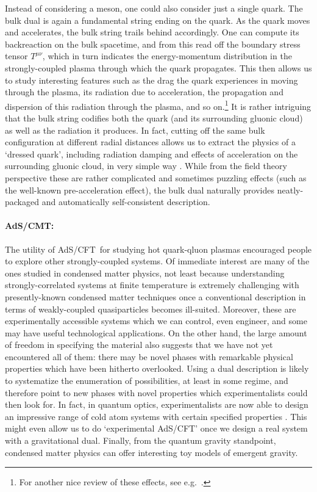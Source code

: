 \documentclass[12pt,a4paper]{article}
\def\AC{AdS/CFT}
\begin{document}
Instead of considering a meson, one could also consider just a single quark.  The bulk dual is again a fundamental string ending on the quark.  As the quark moves and accelerates, the bulk string trails behind accordingly.  One can compute its backreaction on the bulk spacetime, and from this read off the boundary stress tensor $T^{\mu\nu}$, which in turn indicates the energy-momentum distribution in the strongly-coupled plasma through which the quark propagates.  This then allows us to study interesting features such as the drag the quark experiences in moving through the plasma, its radiation due to acceleration,  the propagation and dispersion of this radiation through the plasma, and so on.\footnote{
For another nice review of these effects, see e.g.\ \cite{Chernicoff:2008sa}.
}  It is rather intriguing that the bulk string codifies both the quark (and its surrounding gluonic cloud) as well as the radiation it produces.  In fact,  cutting off the same bulk configuration at different radial distances allows us to extract the physics of a `dressed quark', including radiation damping and effects of acceleration on the surrounding gluonic cloud, in very simple way \cite{Chernicoff:2010wg}.  While from the field theory perspective these are rather complicated and sometimes puzzling effects (such as the well-known pre-acceleration effect), the bulk dual naturally provides neatly-packaged and automatically self-consistent description.

\paragraph{AdS/CMT:}  %
The utility of \AC\ for studying hot quark-qluon plasmas encouraged people to explore other strongly-coupled systems.  Of immediate interest are many of the ones studied in condensed matter physics, not least because understanding  strongly-correlated systems at finite temperature is extremely challenging with presently-known condensed matter techniques once a conventional description in terms of weakly-coupled quasiparticles becomes ill-suited.  Moreover, these are experimentally accessible systems which we can control, even engineer, and some may have useful technological applications.  On the other hand, the large amount of freedom in specifying the material also suggests that we have not yet encountered all of them:  there may be novel phases with remarkable physical properties which have been hitherto overlooked.  Using a dual description is likely to systematize the enumeration of possibilities, at least in some regime, and therefore point to  new phases with novel properties which experimentalists could then look for.  In fact, in quantum optics, experimentalists are now able to design an impressive range of cold atom systems with certain specified properties \cite{greiner2008cm}.  This might even allow us to do `experimental \AC' once we design a real system with a gravitational dual.
Finally, from the quantum gravity standpoint, condensed matter physics can offer interesting toy models of emergent gravity.
\end{document}
